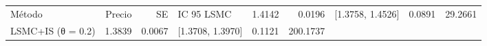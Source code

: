 \begin{tabular}{lrrlrr}
\toprule
Método & Precio & SE & IC 95 %
\midrule
LSMC & 1.4142 & 0.0196 & [1.3758, 1.4526] & 0.0891 & 29.2661 \\
LSMC+IS (θ = 0.2) & 1.3839 & 0.0067 & [1.3708, 1.3970] & 0.1121 & 200.1737 \\
\bottomrule
\end{tabular}
